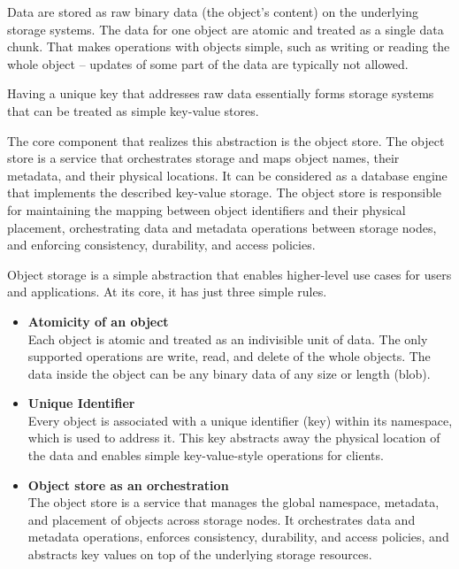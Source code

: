 Data are stored as raw binary data (the object's content) on the underlying storage systems. The data for one object are atomic and treated as a single data chunk. That makes operations with objects simple, such as writing or reading the whole object -- updates of some part of the data are typically not allowed. \cite{mesnier_storage_2003}

Having a unique key that addresses raw data essentially forms storage systems that can be treated as simple key-value stores.

The core component that realizes this abstraction is the object store. The object store is a service that orchestrates storage and maps object names, their metadata, and their physical locations. It can be considered as a database engine that implements the described key-value storage. The object store is responsible for maintaining the mapping between object identifiers and their physical placement, orchestrating data and metadata operations between storage nodes, and enforcing consistency, durability, and access policies. \cite{mesnier_storage_2003}

Object storage is a simple abstraction that enables higher-level use cases for users and applications. At its core, it has just three simple rules.
\begin{itemize}
    \item \textbf{Atomicity of an object} \\
    Each object is atomic and treated as an indivisible unit of data. The only supported operations are write, read, and delete of the whole objects. The data inside the object can be any binary data of any size or length (blob).
    \item \textbf{Unique Identifier} \\
    Every object is associated with a unique identifier (key) within its namespace, which is used to address it. This key abstracts away the physical location of the data and enables simple key-value-style operations for clients.
    \item \textbf{Object store as an orchestration} \\
    The object store is a service that manages the global namespace, metadata, and placement of objects across storage nodes. It orchestrates data and metadata operations, enforces consistency, durability, and access policies, and abstracts key values on top of the underlying storage resources.\\
\cite{mesnier_storage_2003}
\end{itemize}

